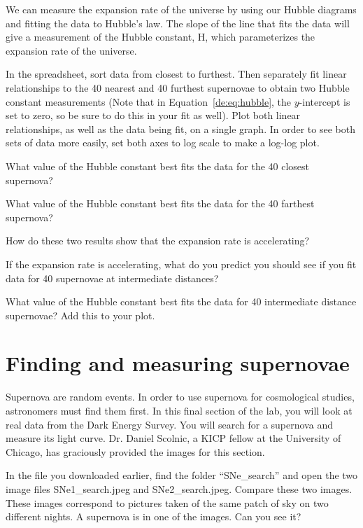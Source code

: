 We can measure the expansion rate of the universe by using our Hubble
diagrams and fitting the data to Hubble’s law. The slope of the line that
fits the data will give a measurement of the Hubble constant, H, which
parameterizes the expansion rate of the universe.

\begin{steps}
	\item In the spreadsheet, sort data from closest to furthest. Then separately fit linear relationships to the 40 nearest and 40 furthest supernovae to obtain two Hubble constant measurements (Note that in Equation~\ref{de:eq:hubble}, the $y$-intercept is set to zero, so be sure to do this in your fit as well). Plot both linear relationships, as well as the data being fit, on a single graph. In order to see both sets of data more easily, set both axes to log scale to make a log-log plot.
	
	\item What value of the Hubble constant best fits the data for the 40
	closest supernova?
	
	\item What value of the Hubble constant best fits the data for the 40
	farthest supernova?
	
	\item How do these two results show that the expansion rate is accelerating?
	
	\item If the expansion rate is accelerating, what do you predict you
	should see if you fit data for 40 supernovae at intermediate
	distances?
	
	\item What value of the Hubble constant best fits the data for 40
	intermediate distance supernovae? Add this to your plot.
\end{steps}

\section{Finding and measuring supernovae}

Supernova are random events. In order to use supernova for
cosmological studies, astronomers must find them first. In this final
section of the lab, you will look at real data from the Dark Energy
Survey. You will search for a supernova and measure its light curve. Dr.
Daniel Scolnic, a KICP fellow at the University of Chicago, has graciously
provided the images for this section.

\begin{steps}
	\item In the file you downloaded earlier, find the folder “SNe\_search” and
open the two image files SNe1\_search.jpeg and SNe2\_search.jpeg.
Compare these two images. These images correspond to pictures taken
of the same patch of sky on two different nights. A supernova is in one of
the images. Can you see it?
\end{steps}

